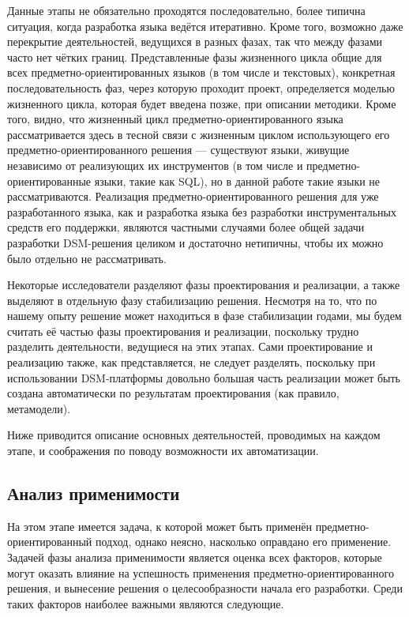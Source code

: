 Данные этапы не обязательно проходятся последовательно, более типична ситуация, когда 
разработка языка ведётся итеративно. Кроме того, возможно даже перекрытие деятельностей, 
ведущихся в разных фазах, так что между фазами часто нет чётких границ. Представленные 
фазы жизненного цикла общие для всех предметно-ориентированных языков (в том числе 
и текстовых), конкретная последовательность фаз, через которую проходит проект, определяется 
моделью жизненного цикла, которая будет введена позже, при описании методики. Кроме 
того, видно, что жизненный цикл предметно-ориентированного языка рассматривается здесь 
в тесной связи с жизненным циклом использующего его предметно-ориентированного решения --- 
существуют языки, живущие независимо от реализующих их инструментов (в том числе и 
предметно-ориентированные языки, такие как SQL), но в данной работе такие языки не 
рассматриваются. Реализация предметно-ориентированного решения для уже разработанного 
языка, как и разработка языка без разработки инструментальных средств его поддержки, 
являются частными случаями более общей задачи разработки \ac{DSM}-решения целиком и достаточно 
нетипичны, чтобы их можно было отдельно не рассматривать.

Некоторые исследователи разделяют фазы проектирования и реализации, а также выделяют 
в отдельную фазу стабилизацию решения. Несмотря на то, что по нашему опыту решение 
может находиться в фазе стабилизации годами, мы будем считать её частью фазы проектирования 
и реализации, поскольку трудно разделить деятельности, ведущиеся на этих этапах. Сами 
проектирование и реализацию также, как представляется, не следует разделять, поскольку 
при использовании \ac{DSM}-платформы довольно большая часть реализации может быть создана 
автоматически по результатам проектирования (как правило, метамодели).

Ниже приводится описание основных деятельностей, проводимых на каждом этапе, и соображения 
по поводу возможности их автоматизации.

\subsection{Анализ применимости}
\label{chapterFeasibilityStudy}
На этом этапе имеется задача, к которой может быть применён предметно-ориентированный 
подход, однако неясно, насколько оправдано его применение. Задачей фазы анализа применимости 
является оценка всех факторов, которые могут оказать влияние на успешность применения 
предметно-ориентированного решения, и вынесение решения о целесообразности начала 
его разработки. Среди таких факторов наиболее важными являются следующие.

